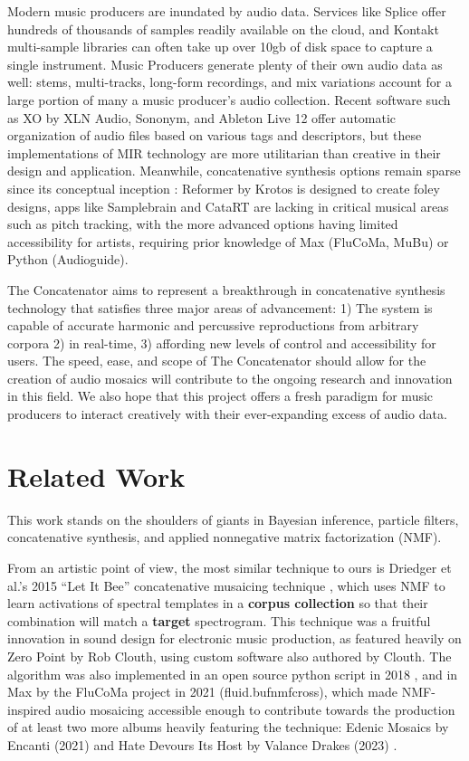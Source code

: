 \documentclass{article}
\begin{document}
Modern music producers are inundated by audio data. Services like Splice offer hundreds of thousands of samples readily available on the cloud, and Kontakt multi-sample libraries can often take up over 10gb of disk space to capture a single instrument. Music Producers generate plenty of their own audio data as well: stems, multi-tracks, long-form recordings, and mix variations account for a large portion of many a music producer's audio collection. Recent software such as XO by XLN Audio, Sononym, and Ableton Live 12 offer automatic organization of audio files based on various tags and descriptors, but these implementations of MIR technology are more utilitarian than creative in their design and application. Meanwhile, concatenative synthesis options remain sparse since its conceptual inception \cite{schwarz2000system}: Reformer by Krotos is designed to create foley designs, apps like Samplebrain and CataRT \cite{schwarz2006real, schwarz2008principles} are lacking in critical musical areas such as pitch tracking, with the more advanced options having limited accessibility for artists, requiring prior knowledge of Max (FluCoMa, MuBu) or Python (Audioguide).

The Concatenator aims to represent a breakthrough in concatenative synthesis technology that satisfies three major areas of advancement: 1) The system is capable of accurate harmonic and percussive reproductions from arbitrary corpora 2) in real-time, 3) affording new levels of control and accessibility for users. The speed, ease, and scope of The Concatenator should allow for the creation of audio mosaics will contribute to the ongoing research and innovation in this field. We also hope that this project offers a fresh paradigm for music producers to interact creatively with their ever-expanding excess of audio data. 

\section{Related Work}
\label{sec:relatedwork}
This work stands on the shoulders of giants in Bayesian inference, particle filters, concatenative synthesis, and applied nonnegative matrix factorization (NMF).

From an artistic point of view, the most similar technique to ours is Driedger et al.'s 2015 ``Let It Bee'' concatenative musaicing technique \cite{driedger2015let}, which uses NMF to learn activations of spectral templates in a \textbf{corpus collection} so that their combination will match a \textbf{target} spectrogram. This technique was a fruitful innovation in sound design for electronic music production, as featured heavily on Zero Point by Rob Clouth\cite{clouth2020}, using custom software also authored by Clouth. The algorithm was also implemented in an open source python script in 2018 \cite{tralie2018}, and in Max by the FluCoMa project in 2021 (fluid.bufnmfcross)\cite{flucoma2021}, which made NMF-inspired audio mosaicing accessible enough to contribute towards the production of at least two more albums heavily featuring the technique: Edenic Mosaics by Encanti (2021) \cite{cantil2021} and Hate Devours Its Host by Valance Drakes (2023) \cite{drakes2023}.
\end{document}
